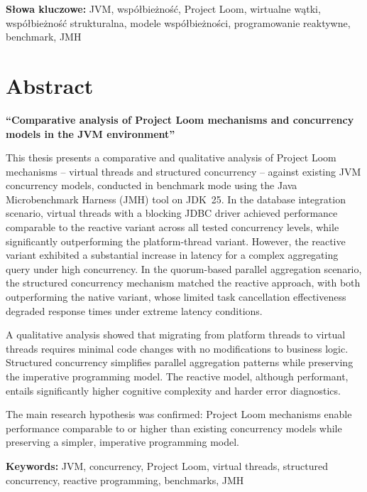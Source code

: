 \vspace{1em}
\noindent\textbf{Słowa kluczowe:} JVM, współbieżność, Project Loom, wirtualne wątki, współbieżność strukturalna, modele współbieżności, programowanie reaktywne, benchmark, JMH

\cleardoublepage

\chapter*{Abstract}

\noindent
\Large{\textbf{“Comparative analysis of Project Loom mechanisms and concurrency models in the JVM environment”}}

\vspace{1cm}
\normalsize{}

This thesis presents a comparative and qualitative analysis of Project Loom mechanisms -- virtual threads and structured concurrency -- against existing JVM concurrency models, conducted in benchmark mode using the Java Microbenchmark Harness (JMH) tool on JDK~25. In the database integration scenario, virtual threads with a blocking JDBC driver achieved performance comparable to the reactive variant across all tested concurrency levels, while significantly outperforming the platform-thread variant. However, the reactive variant exhibited a substantial increase in latency for a complex aggregating query under high concurrency. In the quorum-based parallel aggregation scenario, the structured concurrency mechanism matched the reactive approach, with both outperforming the native variant, whose limited task cancellation effectiveness degraded response times under extreme latency conditions.

A qualitative analysis showed that migrating from platform threads to virtual threads requires minimal code changes with no modifications to business logic. Structured concurrency simplifies parallel aggregation patterns while preserving the imperative programming model. The reactive model, although performant, entails significantly higher cognitive complexity and harder error diagnostics.

The main research hypothesis was confirmed: Project Loom mechanisms enable performance comparable to or higher than existing concurrency models while preserving a simpler, imperative programming model.

\vspace{1em}
\noindent\textbf{Keywords:} JVM, concurrency, Project Loom, virtual threads, structured concurrency, reactive programming, benchmarks, JMH